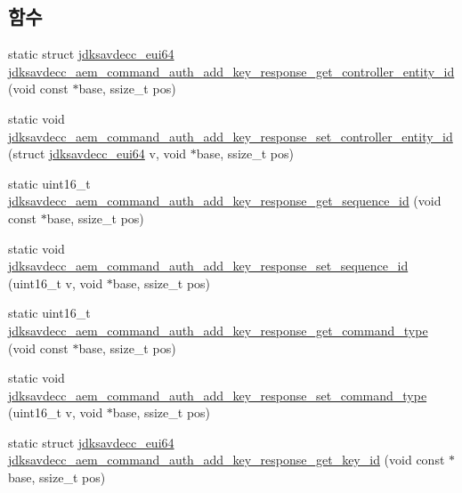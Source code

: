 \subsection*{함수}
\begin{DoxyCompactItemize}
\item 
static struct \hyperlink{structjdksavdecc__eui64}{jdksavdecc\+\_\+eui64} \hyperlink{group__command__auth__add__key__response_gaf06a097463dc7c4c9fbf2d8f3a3c441b}{jdksavdecc\+\_\+aem\+\_\+command\+\_\+auth\+\_\+add\+\_\+key\+\_\+response\+\_\+get\+\_\+controller\+\_\+entity\+\_\+id} (void const $\ast$base, ssize\+\_\+t pos)
\item 
static void \hyperlink{group__command__auth__add__key__response_ga1e7102058d1d79b36590a6d2b7f2aa81}{jdksavdecc\+\_\+aem\+\_\+command\+\_\+auth\+\_\+add\+\_\+key\+\_\+response\+\_\+set\+\_\+controller\+\_\+entity\+\_\+id} (struct \hyperlink{structjdksavdecc__eui64}{jdksavdecc\+\_\+eui64} v, void $\ast$base, ssize\+\_\+t pos)
\item 
static uint16\+\_\+t \hyperlink{group__command__auth__add__key__response_gaeb78505d066b9de70d68043334b7f265}{jdksavdecc\+\_\+aem\+\_\+command\+\_\+auth\+\_\+add\+\_\+key\+\_\+response\+\_\+get\+\_\+sequence\+\_\+id} (void const $\ast$base, ssize\+\_\+t pos)
\item 
static void \hyperlink{group__command__auth__add__key__response_gaae3fd694d430d246d1f6cd616d2d9cdf}{jdksavdecc\+\_\+aem\+\_\+command\+\_\+auth\+\_\+add\+\_\+key\+\_\+response\+\_\+set\+\_\+sequence\+\_\+id} (uint16\+\_\+t v, void $\ast$base, ssize\+\_\+t pos)
\item 
static uint16\+\_\+t \hyperlink{group__command__auth__add__key__response_ga05ae6d83d2f23ba23da2a98e2e30650d}{jdksavdecc\+\_\+aem\+\_\+command\+\_\+auth\+\_\+add\+\_\+key\+\_\+response\+\_\+get\+\_\+command\+\_\+type} (void const $\ast$base, ssize\+\_\+t pos)
\item 
static void \hyperlink{group__command__auth__add__key__response_ga3b0bc9628b34226fb3a8bb1f7d3f3e8c}{jdksavdecc\+\_\+aem\+\_\+command\+\_\+auth\+\_\+add\+\_\+key\+\_\+response\+\_\+set\+\_\+command\+\_\+type} (uint16\+\_\+t v, void $\ast$base, ssize\+\_\+t pos)
\item 
static struct \hyperlink{structjdksavdecc__eui64}{jdksavdecc\+\_\+eui64} \hyperlink{group__command__auth__add__key__response_gaf97ea538ef7125d67d85f801fd0b6e1e}{jdksavdecc\+\_\+aem\+\_\+command\+\_\+auth\+\_\+add\+\_\+key\+\_\+response\+\_\+get\+\_\+key\+\_\+id} (void const $\ast$base, ssize\+\_\+t pos)
\item 

\end{DoxyCompactItemize}
